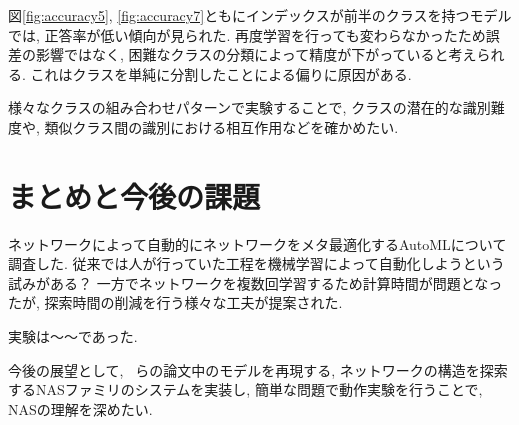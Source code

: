 \documentclass[twocolumn]{jarticle}     %
\begin{document}
図\ref{fig:accuracy5}, \ref{fig:accuracy7}ともにインデックスが前半のクラスを持つモデルでは, 正答率が低い傾向が見られた. 再度学習を行っても変わらなかったため誤差の影響ではなく, 困難なクラスの分類によって精度が下がっていると考えられる. これはクラスを単純に分割したことによる偏りに原因がある.

様々なクラスの組み合わせパターンで実験することで, クラスの潜在的な識別難度や, 類似クラス間の識別における相互作用などを確かめたい.

\section{まとめと今後の課題}

ネットワークによって自動的にネットワークをメタ最適化するAutoMLについて調査した.
従来では人が行っていた工程を機械学習によって自動化しようという試みがある？
一方でネットワークを複数回学習するため計算時間が問題となったが, 探索時間の削減を行う様々な工夫が提案された.

実験は～～であった.

今後の展望として, ~らの論文中\cite{ANAS}のモデルを再現する, ネットワークの構造を探索するNASファミリのシステムを実装し,
簡単な問題で動作実験を行うことで, NASの理解を深めたい.



\end{document}
